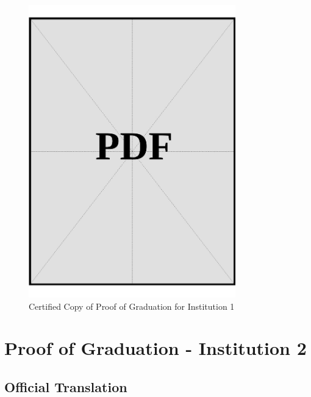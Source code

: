 \begin{figure}[h]
    \centering
    \includegraphics[page=1, width=0.8\textwidth]{../docs/applicant/post-secondary-institutions/institution-1/proof-of-graduation/certified-copies.pdf}
    \caption{Certified Copy of Proof of Graduation for Institution 1}
    \label{fig:institution-1-proof-of-graduation-certified-copy}
\end{figure}

\vspace*{\fill}
\clearpage

\section{Proof of Graduation - Institution 2}\label{sec:institution-2-proof-of-graduation}


\subsection*{Official Translation}
\vspace*{\fill}

